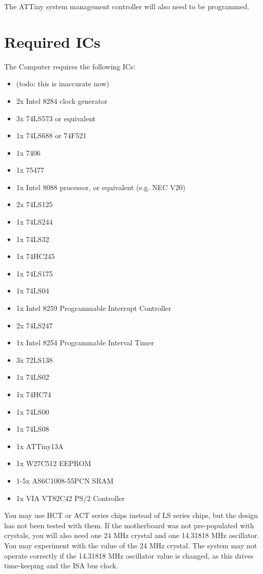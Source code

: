\documentclass[twoside,10pt,letterpaper]{refart}
\begin{document}
The ATTiny system management controller will also need to be programmed.

\section{Required ICs}
The  Computer requires the following ICs:
\begin{itemize}
    \item (todo: this is inaccurate now)
    \item 2x Intel 8284 clock generator
    \item 3x 74LS573 or equivalent
    \item 1x 74LS688 or 74F521
    \item 1x 7406
    \item 1x 75477
    \item 1x Intel 8088 processor, or equivalent (e.g. NEC V20)
    \item 2x 74LS125
    \item 1x 74LS244
    \item 1x 74LS32
    \item 1x 74HC245
    \item 1x 74LS175
    \item 1x 74LS04
    \item 1x Intel 8259 Programmable Interrupt Controller
    \item 2x 74LS247
    \item 1x Intel 8254 Programmable Interval Timer
    \item 3x 72LS138
    \item 1x 74LS02
    \item 1x 74HC74
    \item 1x 74LS00
    \item 1x 74LS08
    \item 1x ATTiny13A
    \item 1x W27C512 EEPROM
    \item 1-5x AS6C1008-55PCN SRAM
    \item 1x VIA VT82C42 PS/2 Controller
\end{itemize}

You may use HCT or ACT series chips instead of LS series chips, but the design has not
been tested with them. If the motherboard was not pre-populated with crystals, you will
also need one 24 MHz crystal and one 14.31818 MHz oscillator. You may experiment with the
value of the 24 MHz crystal. The system may not operate correctly if the 14.31818 MHz
oscillator value is changed, as this drives time-keeping and the ISA bus clock.
\end{document}
